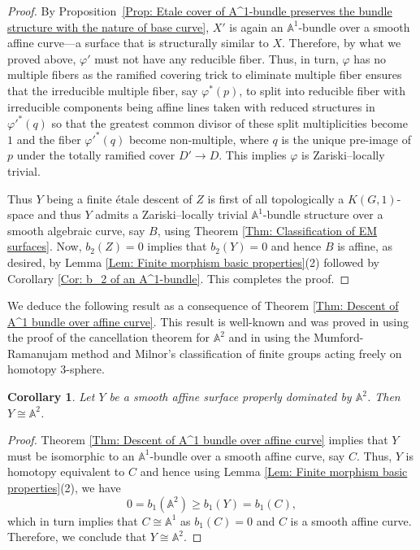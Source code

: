 \documentclass[12pt,reqno,twoside]{amsart}
\newtheorem{cor}[theorem]{Corollary}
\theoremstyle{definition}
\numberwithin{equation}{section}
\newcommand{\A}{\mathbb{A}}
\begin{document}
\begin{proof}
By Proposition~\ref{Prop: Etale cover of A^1-bundle preserves the bundle structure with the nature of base curve}, $X'$ is again an $\A^1$-bundle over a smooth affine curve---a surface that is structurally similar to $X$. Therefore, by what we proved above, $\varphi'$ must not have any reducible fiber. Thus, in turn, $\varphi$ has no multiple fibers as the ramified covering trick to eliminate multiple fiber ensures that the irreducible multiple fiber, say $\varphi^*(p)$, to split into reducible fiber with irreducible components being affine lines taken with reduced structures in $\varphi'^*(q)$ so that the greatest common divisor of these split multiplicities become $1$ and the fiber $\varphi'^*(q)$ become non-multiple, where $q$ is the unique pre-image of $p$ under the totally ramified cover $D'\to D$. This implies $\varphi$ is Zariski--locally trivial.

Thus $Y$ being a finite {\'e}tale descent of $Z$ is first of all topologically a $K(G,1)$-space and thus $Y$ admits a Zariski--locally trivial $\A^1$-bundle structure over a smooth algebraic curve, say $B$, using Theorem \ref{Thm: Classification of EM surfaces}. Now, $b_2(Z)=0$ implies that $b_2(Y)=0$ and hence $B$ is affine, as desired, by Lemma \ref{Lem: Finite morphism basic properties}(2) followed by Corollary \ref{Cor: b_2 of an A^1-bundle}. This completes the proof.
\end{proof}

\medskip

We deduce the following result as a consequence of Theorem \ref{Thm: Descent of A^1 bundle over affine curve}. This result is well-known and was proved in \cite{Miy1986} using the proof of the cancellation theorem for $\A^2$ and in \cite[Theorem 3]{GS1984} using the Mumford-Ramanujam method and Milnor's classification of finite groups acting freely on homotopy $3$-sphere.

\begin{cor}\label{Cor: Affine plane is the only smooth surface properly dominated by an affine plane}
   Let $Y$ be a smooth affine surface properly dominated by $\A^2$. Then $Y \cong \A^2$. 
\end{cor}
\begin{proof}
    Theorem \ref{Thm: Descent of A^1 bundle over affine curve} implies that $Y$ must be isomorphic to an $\A^1$-bundle over a smooth affine curve, say $C$. Thus, $Y$ is homotopy equivalent to $C$ and hence using Lemma \ref{Lem: Finite morphism basic properties}(2), we have $$0=b_1(\A^2)\geq b_1(Y)=b_1(C),$$ which in turn implies that $C\cong \A^1$ as $b_1(C)=0$ and $C$ is a smooth affine curve. Therefore, we conclude that $Y\cong \A^2$.
\end{proof}
\end{document}
